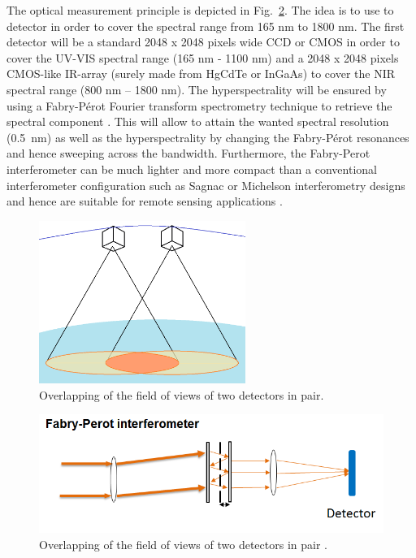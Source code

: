 \documentclass{scrartcl}
\begin{document}
The optical measurement principle is depicted in Fig.~\ref{fig:eng_fig_2}. The idea is to use to detector in order to cover the spectral range from 165 nm to 1800 nm. The first detector will be a standard 2048 x 2048 pixels wide CCD or CMOS in order to cover the UV-VIS spectral range (165 nm - 1100 nm) and a 2048 x 2048 pixels CMOS-like IR-array (surely made from HgCdTe or InGaAs) to cover the NIR spectral range (800 nm – 1800 nm). The hyperspectrality will be ensured by using a Fabry-Pérot Fourier transform spectrometry technique to retrieve the spectral component \citep{khalil,lucey}. This will allow to attain the wanted spectral resolution (0.5~nm) as well as the hyperspectrality by changing the Fabry-Pérot resonances and hence sweeping across the bandwidth. Furthermore, the Fabry-Perot interferometer can be much lighter and more compact than a conventional interferometer configuration such as Sagnac or Michelson interferometry designs and hence are suitable for remote sensing applications \citep{lucey}.

\begin{figure}[hbpt]
\centering
\includegraphics[width=0.6\textwidth]{img/eng_fig_1}
\caption{Overlapping of the field of views of two detectors in pair.}
\label{fig:eng_fig_1}
\end{figure}

\begin{figure}[hbpt]
\centering
\includegraphics[width=\textwidth]{img/eng_fig_2}
\caption{Overlapping of the field of views of two detectors in pair \citep{spec_image}.}
\label{fig:eng_fig_2}
\end{figure}
\end{document}
